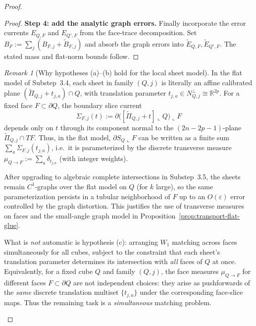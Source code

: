 \documentclass[11pt]{article}
\numberwithin{equation}{section}  %
\theoremstyle{plain}
\theoremstyle{definition}
\theoremstyle{remark}
\newtheorem{remark}[theorem]{Remark}
\newcommand{\R}{\mathbb{R}}
\begin{document}
\begin{proof}
\begin{proof}
\smallskip\noindent
\textbf{Step 4: add the analytic graph errors.}
Finally incorporate the error currents $E_{Q,F}$ and $E_{Q',F}$ from the face-trace decomposition.
Set $B_F:=\sum_j(B_{F,j}+\widetilde B_{F,j})$ and absorb the graph errors into $\widetilde E_{Q,F},\widetilde E_{Q',F}$.
The stated mass and flat-norm bounds follow.
\end{proof}





\begin{remark}[Why hypotheses (a)--(b) hold for the local sheet model]\label{rem:transport-hypotheses}
In the flat model of Substep~3.4, each sheet in family $(Q,j)$ is literally an affine calibrated plane
$(\widetilde\Pi_{Q,j}+t_{j,a})\cap Q$, with translation parameter $t_{j,a}\in N_{Q,j}^\perp\cong\R^{2p}$.
For a fixed face $F\subset\partial Q$, the boundary slice current
\[
\Sigma_{F,j}(t):=\partial\big([\widetilde\Pi_{Q,j}+t]\llcorner Q\big)\llcorner F
\]
depends only on $t$ through its component normal to the $(2n-2p-1)$-plane $\widetilde\Pi_{Q,j}\cap TF$.
Thus, in the flat model, $\partial S_Q\llcorner F$ can be written as a finite sum
$\sum_a \Sigma_{F,j}(t_{j,a})$, i.e.\ it is parameterized by the discrete transverse measure
$\mu_{Q\to F}:=\sum_a \delta_{t_{j,a}}$ (with integer weights).

After upgrading to algebraic complete intersections in Substep~3.5, the sheets remain $C^1$-graphs over the flat model on $Q$
(for $k$ large), so the same parameterization persists in a tubular neighborhood of $F$ up to an $O(\varepsilon)$ error
controlled by the graph distortion.  This justifies the use of transverse measures on faces and the small-angle graph model
in Proposition~\ref{prop:transport-flat-glue}.

What is \emph{not} automatic is hypothesis (c): arranging $W_1$ matching across faces simultaneously for all cubes, subject to
the constraint that each sheet's translation parameter determines its intersection with \emph{all} faces of $Q$ at once.
\smallskip
Equivalently, for a fixed cube $Q$ and family $(Q,j)$, the face measures $\mu_{Q\to F}$ for different faces $F\subset\partial Q$
are not independent choices: they arise as pushforwards of the \emph{same} discrete translation multiset $\{t_{j,a}\}$ under
the corresponding face-slice maps.  Thus the remaining task is a \emph{simultaneous} matching problem.



\end{remark}
\end{proof}
\end{document}
